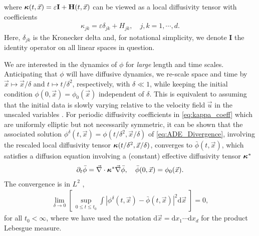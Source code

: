 \documentclass[11pt]{amsart}
\renewcommand{\d}{\mathrm{d}}
\newcommand{\Hb}{\mathbf{H}}
\newcommand{\Ib}{\mathbf{I}}
\newcommand\bkappa{\mbox{\boldmath${\kappa}$}}
\begin{document}
%
where $\bkappa(t,\vec{x})=\varepsilon\Ib+\Hb(t,\vec{x})$ can be viewed as a local
diffusivity tensor with coefficients
%
\begin{align}\label{eq:kappa_coeff}
  \kappa_{jk}=\varepsilon\delta_{jk}+H_{jk},\quad j,k=1,\cdots,d.
\end{align}
%
Here, $\delta_{jk}$ is the Kronecker delta and, for notational simplicity,
we denote $\Ib$ the identity operator on all linear spaces in
question.   




We are interested in the dynamics of $\phi$ for \emph{large} length and
time scales. Anticipating that $\phi$ will have diffusive dynamics, we
re-scale space and time by $\vec{x}\mapsto\vec{x}/\delta$ and $t\mapsto t/\delta^2$,
respectively, with $\delta\ll1$, while keeping the initial condition
$\phi(0,\vec{x})=\phi_0(\vec{x})$ independent 
of $\delta$. This is equivalent to assuming that the initial data is slowly
varying relative to the velocity field $\vec{u}$ in the unscaled
variables
\cite{McLaughlin:SIAM_JAM:780,Fannjiang:SIAM_JAM:333,Fannjiang:1997:1033}. 
For periodic diffusivity coefficients in \eqref{eq:kappa_coeff} which
are uniformly elliptic but not necessarily symmetric, it can be shown 
\cite{Fannjiang:SIAM_JAM:333} that the associated solution
$\phi^\delta(t,\vec{x})=\phi(t/\delta^2,\vec{x}/\delta)$  of \eqref{eq:ADE_Divergence},
involving the rescaled local diffusivity tensor
$\bkappa(t/\delta^2,\vec{x}/\delta)$, converges to $\bar{\phi}(t,\vec{x})$, which
satisfies a diffusion equation involving a (constant) effective
diffusivity tensor $\bkappa^*$
%
\begin{align}
  \partial_t\bar{\phi}=\vec{\nabla}\cdot\bkappa^*\vec{\nabla}\bar{\phi}, \quad
  \bar{\phi}(0,\vec{x})=\phi_0(\vec{x}).
\end{align}
%
The convergence is in $L^2$ \cite{Fannjiang:SIAM_JAM:333},
%
\begin{align}
  \lim_{\delta\to0}\left[\,\sup_{0\leq t\leq t_0}
    \int\left|\phi^\delta(t,\vec{x})-\bar{\phi}(t,\vec{x})\right|^2\d\vec{x}
    \;\right]=0,
\end{align}
%
for all $t_0<\infty$, where we have used the notation $\d\vec{x}=\d x_1\cdots \d
x_d$ for the product Lebesgue measure.
\end{document}
